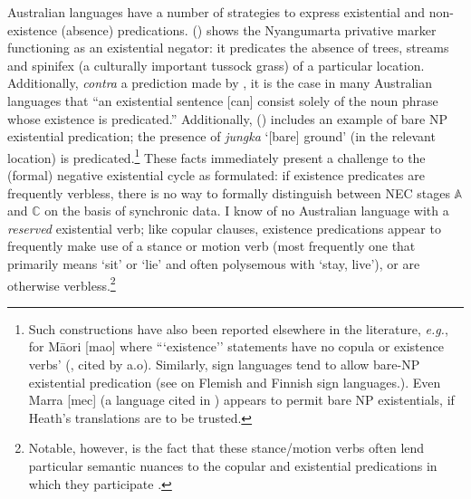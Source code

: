 Australian languages have a number of strategies to express existential and non-existence (absence) predications. () shows the Nyangumarta privative marker functioning as an existential negator: it predicates the absence of trees, streams and spinifex (a culturally important tussock grass) of a particular location. Additionally, \textit{contra} a prediction made by \citet[19]{Croft1991}, it is the case in many Australian languages that ``an existential sentence [can] consist solely of the noun phrase whose existence is predicated.'' Additionally, () includes an example of bare NP existential predication; the presence of \textit{jungka} `[bare] ground' (in the relevant location) is predicated.\footnote{Such constructions have also been reported elsewhere in the literature, \textit{e.g.}, for Māori [\gls{mao}] where ```existence'' statements have no copula or existence verbs' (\citealp[78]{Bauer1993}, cited by \citealp{Chung2004} a.o). Similarly, sign languages tend to allow bare-NP existential predication (see \citealt[26ff]{deWeert2016} on Flemish and Finnish sign languages.). Even Marra [\gls{mec}] (a language cited in \citealt[14]{Croft1991}) appears to permit bare NP existentials, if Heath's \citeyearpar[364]{Heath1981} translations are to be trusted.}
 These facts immediately present a challenge to the (formal) negative existential cycle as formulated: if existence predicates are frequently verbless, there is no way to formally distinguish between NEC stages $ \boldsymbol{\mathbb{A}} $ and $ \boldsymbol{\mathbb{C}} $ on the basis of synchronic data. I know of no Australian language with a \textit{reserved} existential verb; like copular clauses, existence predications appear to frequently make use of a stance or motion verb (most frequently one that primarily means `sit' or `lie' and often polysemous with `stay, live'), or are otherwise verbless.\footnote{Notable, however, is the fact that these stance/motion verbs often lend particular semantic nuances to the copular and existential predications in which they participate \citep[see e.g. ][610-611]{Wilkinson1991}.}

